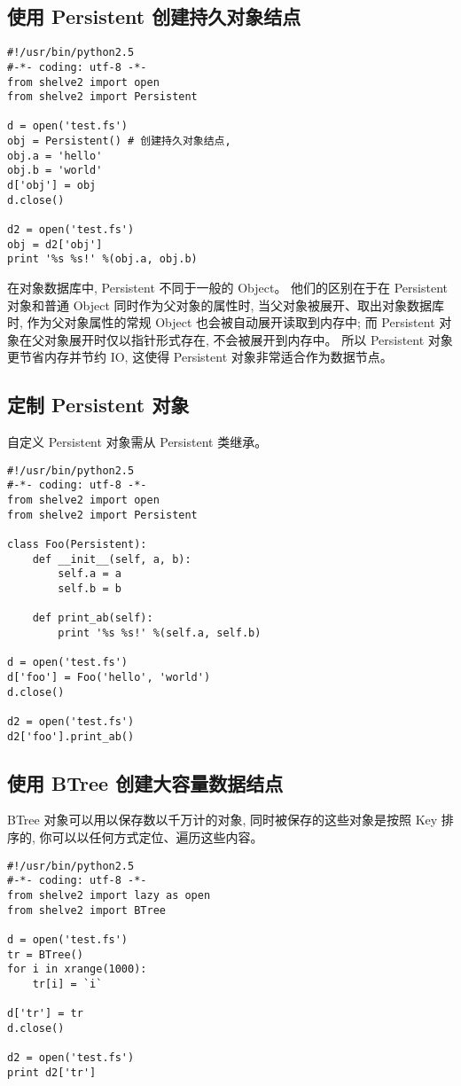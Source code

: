 \documentclass{manual}
\begin{document}
\subsection{使用 Persistent 创建持久对象结点}

\begin{verbatim}
#!/usr/bin/python2.5
#-*- coding: utf-8 -*-
from shelve2 import open
from shelve2 import Persistent

d = open('test.fs')
obj = Persistent() # 创建持久对象结点,
obj.a = 'hello'
obj.b = 'world'
d['obj'] = obj
d.close()

d2 = open('test.fs')
obj = d2['obj']
print '%s %s!' %(obj.a, obj.b)
\end{verbatim}

在对象数据库中, Persistent 不同于一般的 Object。
他们的区别在于在 Persistent 对象和普通 Object 同时作为父对象的属性时,
当父对象被展开、取出对象数据库时, 作为父对象属性的常规 Object 也会被自动展开读取到内存中;
而 Persistent 对象在父对象展开时仅以指针形式存在, 不会被展开到内存中。
所以 Persistent 对象更节省内存并节约 IO, 这使得 Persistent 对象非常适合作为数据节点。

\subsection{定制 Persistent 对象}

自定义 Persistent 对象需从 Persistent 类继承。

\begin{verbatim}
#!/usr/bin/python2.5
#-*- coding: utf-8 -*-
from shelve2 import open
from shelve2 import Persistent

class Foo(Persistent):
	def __init__(self, a, b):
		self.a = a
		self.b = b

	def print_ab(self):
		print '%s %s!' %(self.a, self.b)

d = open('test.fs')
d['foo'] = Foo('hello', 'world')
d.close()

d2 = open('test.fs')
d2['foo'].print_ab()
\end{verbatim}

\subsection{使用 BTree 创建大容量数据结点}

BTree 对象可以用以保存数以千万计的对象, 同时被保存的这些对象是按照 Key 排序的, 你可以以任何方式定位、遍历这些内容。

\begin{verbatim}
#!/usr/bin/python2.5
#-*- coding: utf-8 -*-
from shelve2 import lazy as open
from shelve2 import BTree

d = open('test.fs')
tr = BTree()
for i in xrange(1000):
	tr[i] = `i`

d['tr'] = tr
d.close()

d2 = open('test.fs')
print d2['tr']
\end{verbatim}
\end{document}
